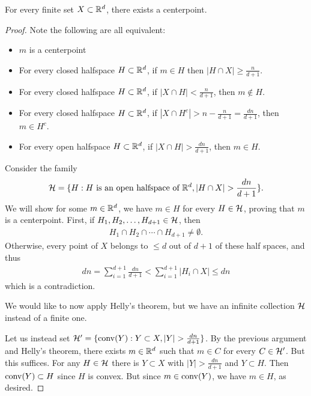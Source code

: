 \begin{theorem}
For every finite set $X\subset \mathbb{R}^d$, there exists a centerpoint.
\end{theorem}
\begin{proof}	
Note the following are all equivalent:
\begin{itemize}
\item $m$ is a centerpoint
	\item  For every closed halfspace $H\subset \mathbb{R}^d$, if $m\in H$ then $|H\cap X| \geq \frac{n}{d+1}$.
	\item For every closed halfspace $H\subset \mathbb{R}^d$, if  $|X\cap H| < \frac{n}{d+1}$, then $m\not \in H$.
	\item For every closed halfspace $H\subset \mathbb{R}^d$, if $|X\cap H^c| > n - \frac{n}{d+1} = \frac{dn}{d+1}$, then $m\in H^c$.
	\item For every open halfspace $H\subset \mathbb{R}^d$, if $|X\cap H| >  \frac{dn}{d+1}$, then $m\in H$.
\end{itemize}
Consider the family 
\begin{align*}	
\mathcal{H} = \{H: H \text{ is an open halfspace of }\mathbb{R}^d, |H\cap X| >  \frac{dn}{d+1}\}.
\end{align*}
We will show for some $m \in \mathbb{R}^d$, we have $m\in H$ for every $H\in \mathcal{H}$, proving that $m$ is a centerpoint. 
First, if $H_1,H_2,\dotsc,H_{d+1}\in \mathcal{H}$, then
\begin{align*}	
H_1\cap H_2\cap \dotsm \cap H_{d+1}\neq \emptyset.
\end{align*}
Otherwise, every point of $X$ belongs to $\leq d$ out of $d+1$ of these half spaces, and thus
\begin{align*}	
dn = \sum_{i=1}^{d+1} \frac{dn}{d+1} < \sum_{i=1}^{d+1} |H_i \cap X| \leq d n
\end{align*}
which is a contradiction.

We would like to now apply Helly's theorem, but we have an infinite collection $\mathcal{H}$ instead of a finite one.

Let us instead set $\mathcal{H}' = \{ \operatorname{conv}(Y): Y\subset X, |Y| > \frac{dn}{d+1}\}$. By the previous argument and Helly's theorem, there exists $m\in \mathbb{R}^d$ such that $m\in C$ for every $C\in \mathcal{H}'$. But this suffices. For any $H\in \mathcal{H}$  there is $Y\subset X$ with $|Y| > \frac{dn}{d+1}$ and $Y\subset H$. Then $\operatorname{conv}(Y) \subset H$ since $H$ is convex. But since $m\in \operatorname{conv}(Y)$, we have $m\in H$, as desired.%
\end{proof}




